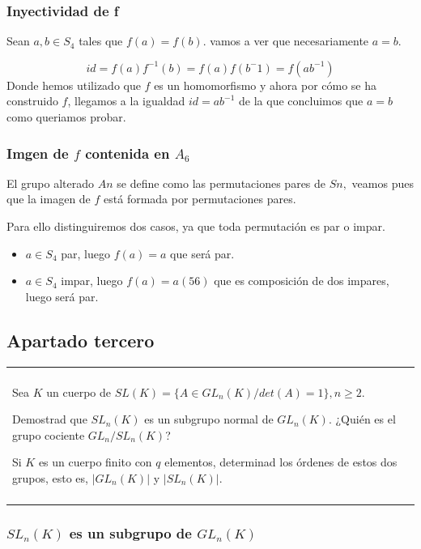 \documentclass[12pt]{article}
\newenvironment{micaja}
{
    \begin{center}
    \begin{tabular}{|p{0.9\textwidth}|}
    \hline\\
    }   
    {   
    \\\\\hline
    \end{tabular} 
    \end{center}
    }
\begin{document}
\subsubsection*{Inyectividad de f}

Sean $a,b \in S_4$ tales que $f(a) = f(b).$ 
vamos a ver que necesariamente $a=b.$

\begin{equation*}
    id = f(a)f^{-1}(b) = f(a)f(b^-1) = f(ab^{-1})
\end{equation*}
Donde hemos utilizado que $f$ es un homomorfismo y ahora por cómo se ha construido $f$, 
llegamos a la igualdad $id = ab^{-1}$ de la que concluimos que $a = b$ como queriamos probar. 

\subsubsection*{Imgen de $f$ contenida en $A_6$}
El grupo alterado $An$ se define como las permutaciones pares de $Sn,$ veamos pues que 
la imagen de $f$ está formada por permutaciones pares. 


Para ello distinguiremos dos casos, ya que toda permutación es par o impar.
\begin{itemize}
    \item $a \in S_4$ par, luego $f(a) = a$ que será par. 
    \item $a \in S_4$ impar, luego $f(a) = a(56)$ que es composición de dos impares, luego será par.
\end{itemize}

\subsection{Apartado tercero}

\begin{micaja}
    
    Sea $K$ un cuerpo de $SL(K) = \{ A \in GL_n(K)/ det(A)=1\}, n \geq 2.$

    Demostrad que $SL_n(K)$ es un subgrupo normal de $GL_n(K).$ ¿Quién es el grupo cociente
    $GL_n/SL_n(K)$?

    Si $K$ es un cuerpo finito con $q$ elementos, determinad los órdenes de estos dos grupos, 
    esto es, $|GL_n(K)|$ y $|SL_n(K)|.$
\end{micaja}

\subsubsection*{$SL_n(K)$ es un subgrupo de $GL_n(K)$}
\end{document}
